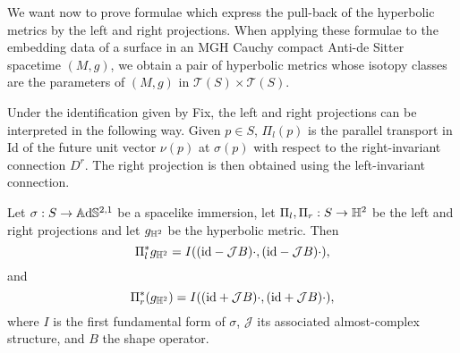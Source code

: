 We want now to prove formulae which express the pull-back of the hyperbolic metrics by the left and right projections. When applying these formulae to the embedding data of a surface in an MGH Cauchy compact Anti-de Sitter spacetime $(M,g)$, we obtain a pair of hyperbolic metrics whose isotopy classes are the parameters of $(M,g)$
in $\mathcal{T}(S)\times\mathcal{T}(S).$

\begin{observation}\label{rem:parallel transport}
    Under the identification given by Fix, the left and right projections can be interpreted in the following way. Given $p\in S$, $\Pi_l(p)$ is the parallel transport in Id of the future unit vector $\nu(p)$ at $\sigma(p)$ with respect to the right-invariant connection $D^r$. The right projection is then obtained using the left-invariant connection. 
\end{observation}

\begin{proposition}\label{prop:left right pull-back metric}
    Let $\sigma:S\to\mathbb{A}\mathrm{d}\mathbb{S}^{2,1}$ be a spacelike immersion, let $\Pi_l,\Pi_r:S\to\mathbb{H}^2$ be the left and right projections and let $g_{\mathbb{H}^2}$ be the hyperbolic metric. Then
    \[
        \Pi_l^*g_{\mathbb{H}^2}=I((\text{id}-\mathcal{J}B)\cdot,(\text{id}-\mathcal{J}B)\cdot),
    \]
        and
    \[
        \Pi_r^*(g_{\mathbb{H}^2})=I((\text{id}+\mathcal{J}B)\cdot,(\text{id}+\mathcal{J}B)\cdot),
    \]
    where $I$ is the first fundamental form of $\sigma$, $\mathcal{J}$ its associated almost-complex structure, and $B$ the shape operator.
\end{proposition}


